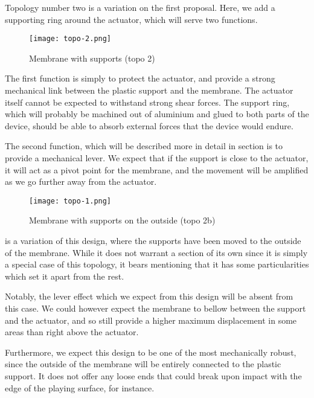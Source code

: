 Topology number two is a variation on the first proposal. Here, we add a
supporting ring around the actuator, which will serve two functions.

\begin{figure}[h]
  \begin{center}
    \texttt{[image: topo-2.png]}
  \end{center}
  \caption{Membrane with supports (topo 2)}
  \label{fig:topo-2}
\end{figure}

The first function is simply to protect the actuator, and provide a strong
mechanical link between the plastic support and the membrane. The actuator
itself cannot be expected to withstand strong shear forces. The support ring,
which will probably be machined out of aluminium and glued to both parts of the
device, should be able to absorb external forces that the device would endure.

The second function, which will be described more in detail in section
 is to provide a mechanical lever. We expect that if the support
is close to the actuator, it will act as a pivot point for the membrane, and the
movement will be amplified as we go further away from the actuator.

\begin{figure}[h]
  \begin{center}
    \texttt{[image: topo-1.png]}
  \end{center}
  \caption{Membrane with supports on the outside (topo 2b)}
  \label{fig:topo-1}
\end{figure}

 is a variation of this design, where the supports have been
moved to the outside of the membrane. While it does not warrant a section of its
own since it is simply a special case of this topology, it bears mentioning that
it has some particularities which set it apart from the rest.

Notably, the lever effect which we expect from this design will be absent from
this case. We could however expect the membrane to bellow between the support
and the actuator, and so still provide a higher maximum displacement in some
areas than right above the actuator.

Furthermore, we expect this design to be one of the most mechanically robust,
since the outside of the membrane will be entirely connected to the plastic
support. It does not offer any loose ends that could break upon impact with the
edge of the playing surface, for instance.



